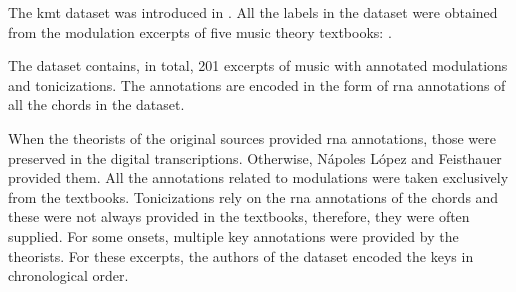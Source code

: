 
The \gls{kmt} dataset was introduced in
\textcite{napoleslopez2020local}. All the labels in the
dataset were obtained from the modulation excerpts of five
music theory textbooks: \textcite{aldwell2019harmony,
kostka2008tonal, reger1904supplement,
rimskikorsakov1886practical, tchaikovsky1872guide}.

The dataset contains, in total, 201 excerpts of music with
annotated modulations and tonicizations. The annotations are
encoded in the form of \gls{rna} annotations of all the
chords in the dataset. 

When the theorists of the original sources provided
\gls{rna} annotations, those were preserved in the digital
transcriptions. Otherwise, N\'apoles L\'opez and Feisthauer
provided them. All the annotations related to modulations
were taken exclusively from the textbooks. Tonicizations
rely on the \gls{rna} annotations of the chords and these
were not always provided in the textbooks, therefore, they
were often supplied. For some onsets, multiple key
annotations were provided by the theorists. For these
excerpts, the authors of the dataset encoded the keys in
chronological order.
